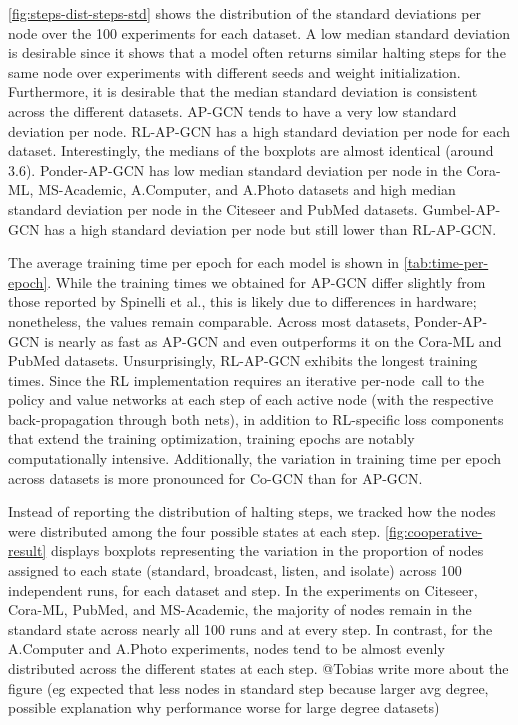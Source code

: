 \documentclass{gdl}
\begin{document}
\autoref{fig:steps-dist-steps-std} shows the distribution of the standard deviations per node over the 100 experiments for each dataset. A low median standard deviation is desirable since it shows that a model often returns similar halting steps for the same node over experiments with different seeds and weight initialization. Furthermore, it is desirable that the median standard deviation is consistent across the different datasets. AP-GCN tends to have a very low standard deviation per node. RL-AP-GCN has a high standard deviation per node for each dataset. Interestingly, the medians of the boxplots are almost identical (around 3.6). Ponder-AP-GCN has low median standard deviation per node in the Cora-ML, MS-Academic, A.Computer, and A.Photo datasets and high median standard deviation per node in the Citeseer and PubMed datasets. Gumbel-AP-GCN has a high standard deviation per node but still lower than RL-AP-GCN. 

The average training time per epoch for each model is shown in \autoref{tab:time-per-epoch}. While the training times we obtained for AP-GCN differ slightly from those reported by Spinelli et al., this is likely due to differences in hardware; nonetheless, the values remain comparable. Across most datasets, Ponder-AP-GCN is nearly as fast as AP-GCN and even outperforms it on the Cora-ML and PubMed datasets. Unsurprisingly, RL-AP-GCN exhibits the longest training times. Since the RL implementation requires an iterative per-node call to the policy and value networks at each step of each active node (with the respective back-propagation through both nets), in addition to RL-specific loss components that extend the training optimization, training epochs are notably computationally intensive. Additionally, the variation in training time per epoch across datasets is more pronounced for Co-GCN than for AP-GCN.

Instead of reporting the distribution of halting steps, we tracked how the nodes were distributed among the four possible states at each step. \autoref{fig:cooperative-result} displays boxplots representing the variation in the proportion of nodes assigned to each state (standard, broadcast, listen, and isolate) across 100 independent runs, for each dataset and step. In the experiments on Citeseer, Cora-ML, PubMed, and MS-Academic, the majority of nodes remain in the standard state across nearly all 100 runs and at every step. In contrast, for the A.Computer and A.Photo experiments, nodes tend to be almost evenly distributed across the different states at each step. @Tobias write more about the figure (eg expected that less nodes in standard step because larger avg degree, possible explanation why performance worse for large degree datasets)
\end{document}
